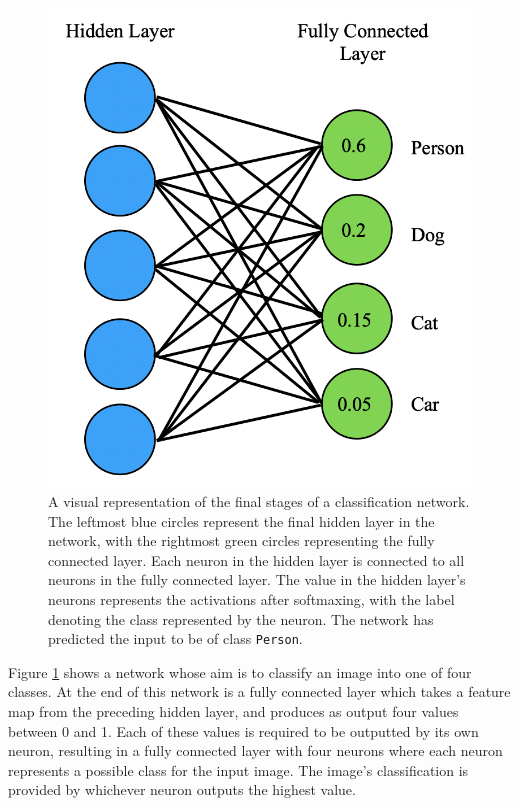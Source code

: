 \begin{figure}[!hb]
	\begin{center}
		\includegraphics[scale=0.45]{Chapter2/figs/fully-connected.png}
	\end{center}
	\caption{A visual representation of the final stages of a classification network. The leftmost blue circles represent the final hidden layer in the network, with the rightmost green circles representing the fully connected layer. Each neuron in the hidden layer is connected to all neurons in the fully connected layer. The value in the hidden layer's neurons represents the activations after softmaxing, with the label denoting the class represented by the neuron. The network has predicted the input to be of class \texttt{Person}.}
	\label{fig:fully-connected}
\end{figure}

Figure \ref{fig:fully-connected} shows a network whose aim is to classify an image into one of four classes. At the end of this network is a fully connected layer which takes a feature map from the preceding hidden layer, and produces as output four values between 0 and 1. Each of these values is required to be outputted by its own neuron, resulting in a fully connected layer with four neurons where each neuron represents a possible class for the input image. The image's classification is provided by whichever neuron outputs the highest value. 

